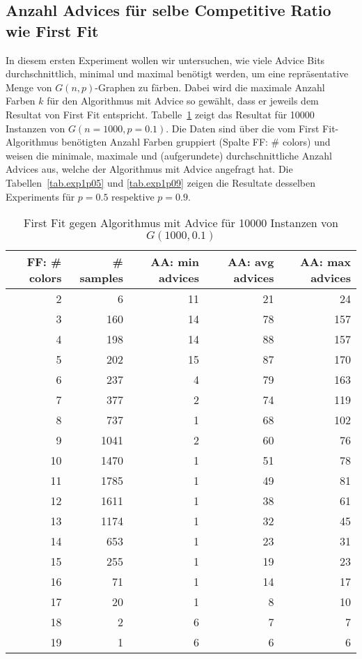 \documentclass[11pt]{scrreprt} %
\theoremstyle{definition}
\begin{document}
\subsection{Anzahl Advices für selbe Competitive Ratio wie First Fit}

In diesem ersten Experiment wollen wir untersuchen, wie viele Advice Bits durchschnittlich, minimal und maximal benötigt werden, um eine repräsentative Menge von $G(n,p)$-Graphen zu färben. Dabei wird die maximale Anzahl Farben $k$ für den Algorithmus mit Advice so gewählt, dass er jeweils dem Resultat von First Fit entspricht. Tabelle~\ref{tab.exp1p01} zeigt das Resultat für 10000 Instanzen von $G(n = 1000, p = 0.1)$. Die Daten sind über die vom First Fit-Algorithmus benötigten Anzahl Farben gruppiert (Spalte FF: \# colors) und weisen die minimale, maximale und (aufgerundete) durchschnittliche Anzahl Advices aus, welche der Algorithmus mit Advice angefragt hat. Die Tabellen~\ref{tab.exp1p05} und \ref{tab.exp1p09} zeigen die Resultate desselben Experiments für $p = 0.5$ respektive $p = 0.9$.

\begin{table}
\caption{First Fit gegen Algorithmus mit Advice für 10000 Instanzen von $G(1000, 0.1)$}
\label{tab.exp1p01}


  \centering
    \begin{tabular}{rrrrr}
    \toprule
    FF: \# colors & \# samples & AA: min advices & AA: avg advices & AA: max advices \\
    \midrule
    2     & 6     & 11    & 21    & 24 \\
    3     & 160   & 14    & 78    & 157 \\
    4     & 198   & 14    & 88    & 157 \\
    5     & 202   & 15    & 87    & 170 \\
    6     & 237   & 4     & 79    & 163 \\
    7     & 377   & 2     & 74    & 119 \\
    8     & 737   & 1     & 68    & 102 \\
    9     & 1041  & 2     & 60    & 76 \\
    10    & 1470  & 1     & 51    & 78 \\
    11    & 1785  & 1     & 49    & 81 \\
    12    & 1611  & 1     & 38    & 61 \\
    13    & 1174  & 1     & 32    & 45 \\
    14    & 653   & 1     & 23    & 31 \\
    15    & 255   & 1     & 19    & 23 \\
    16    & 71    & 1     & 14    & 17 \\
    17    & 20    & 1     & 8     & 10 \\
    18    & 2     & 6     & 7     & 7 \\
    19    & 1     & 6     & 6     & 6 \\
    \bottomrule
    \end{tabular}%

\end{table}
\end{document}
